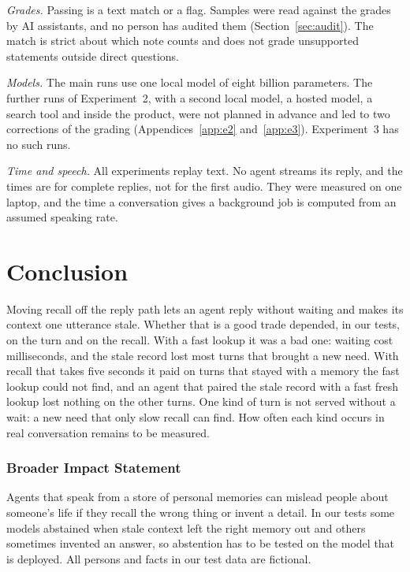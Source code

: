 \documentclass[10pt]{article}
\begin{document}
\emph{Grades.} Passing is a text match or a flag. Samples were read against the grades by AI assistants, and no person has audited them (Section~\ref{sec:audit}). The match is strict about which note counts and does not grade unsupported statements outside direct questions.

\emph{Models.} The main runs use one local model of eight billion parameters. The further runs of Experiment~2, with a second local model, a hosted model, a search tool and inside the product, were not planned in advance and led to two corrections of the grading (Appendices~\ref{app:e2} and~\ref{app:e3}). Experiment~3 has no such runs.

\emph{Time and speech.} All experiments replay text. No agent streams its reply, and the times are for complete replies, not for the first audio. They were measured on one laptop, and the time a conversation gives a background job is computed from an assumed speaking rate.

\section{Conclusion}

Moving recall off the reply path lets an agent reply without waiting and makes its context one utterance stale. Whether that is a good trade depended, in our tests, on the turn and on the recall. With a fast lookup it was a bad one: waiting cost milliseconds, and the stale record lost most turns that brought a new need. With recall that takes five seconds it paid on turns that stayed with a memory the fast lookup could not find, and an agent that paired the stale record with a fast fresh lookup lost nothing on the other turns. One kind of turn is not served without a wait: a new need that only slow recall can find. How often each kind occurs in real conversation remains to be measured.

\subsubsection*{Broader Impact Statement}
Agents that speak from a store of personal memories can mislead people about someone's life if they recall the wrong thing or invent a detail. In our tests some models abstained when stale context left the right memory out and others sometimes invented an answer, so abstention has to be tested on the model that is deployed. All persons and facts in our test data are fictional.
\end{document}
